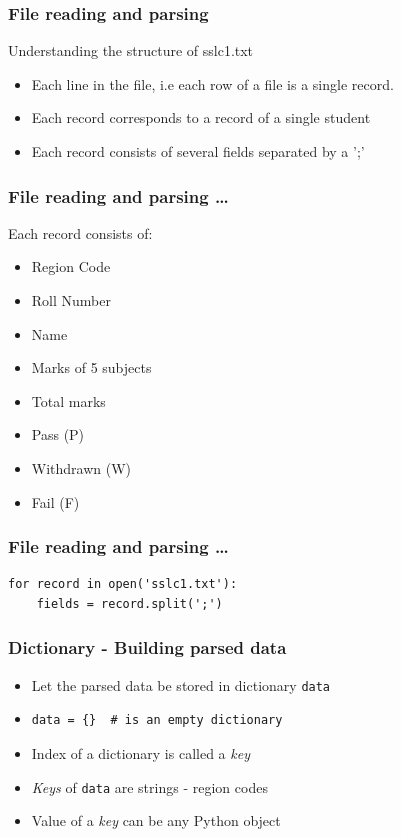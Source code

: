\documentclass[14pt,compress]{beamer}
\newcommand{\typ}[1]{\lstinline{#1}}
\begin{document}
\begin{frame}
  \frametitle{File reading and parsing}
  Understanding the structure of sslc1.txt
  \begin{itemize}
    \item Each line in the file, i.e each row of a file is a single record.
    \item Each record corresponds to a record of a single student
    \item Each record consists of several fields separated by a ';'
  \end{itemize}
\end{frame}

\begin{frame}
  \frametitle{File reading and parsing \ldots}
  Each record consists of:
  \begin{itemize}
    \item Region Code
    \item Roll Number
    \item Name
    \item Marks of 5 subjects
    \item Total marks
    \item Pass (P)
    \item Withdrawn (W)
    \item Fail (F)
  \end{itemize}
\end{frame}

\begin{frame}[fragile]
  \frametitle{File reading and parsing \ldots}
  \begin{lstlisting}
for record in open('sslc1.txt'):
    fields = record.split(';')
  \end{lstlisting}
\end{frame}

\begin{frame}[fragile]
  \frametitle{Dictionary - Building parsed data}
  \begin{itemize}
    \item Let the parsed data be stored in dictionary \typ{data}
    \item \begin{lstlisting}
data = {}  # is an empty dictionary
\end{lstlisting}
    \item Index of a dictionary is called a \emph{key}
    \item \emph{Keys} of \typ{data} are strings - region codes
    \item Value of a \emph{key} can be any Python object
  \end{itemize}
\end{frame}
\end{document}
